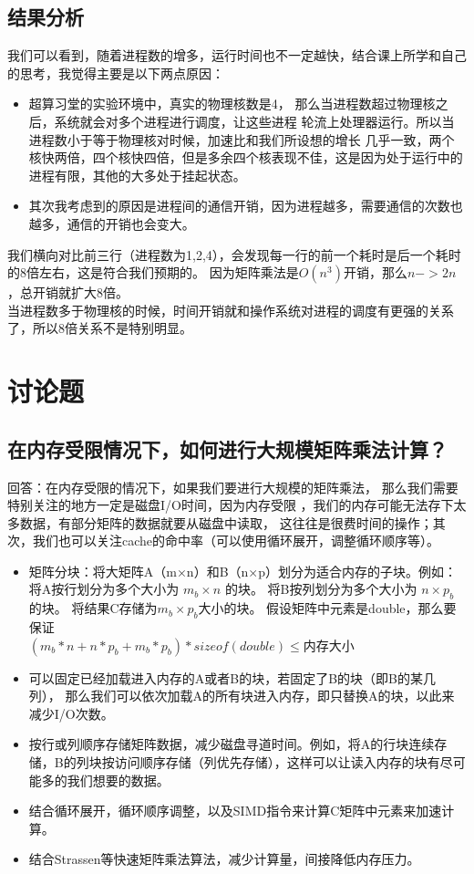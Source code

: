 \documentclass{SYSUReport}
\begin{document}
\subsection{结果分析}
我们可以看到，随着进程数的增多，运行时间也不一定越快，结合课上所学和自己的思考，我觉得主要是以下两点原因：
\begin{itemize}
   \item 超算习堂的实验环境中，真实的物理核数是4，
   那么当进程数超过物理核之后，系统就会对多个进程进行调度，让这些进程
   轮流上处理器运行。所以当进程数小于等于物理核对时候，加速比和我们所设想的增长
   几乎一致，两个核快两倍，四个核快四倍，但是多余四个核表现不佳，这是因为处于运行中的进程有限，其他的大多处于挂起状态。
   \item 其次我考虑到的原因是进程间的通信开销，因为进程越多，需要通信的次数也越多，通信的开销也会变大。 
\end{itemize}
我们横向对比前三行（进程数为1,2,4），会发现每一行的前一个耗时是后一个耗时的8倍左右，这是符合我们预期的。
因为矩阵乘法是$O(n^3)$开销，那么$n->2n$，总开销就扩大8倍。
\\当进程数多于物理核的时候，时间开销就和操作系统对进程的调度有更强的关系了，所以8倍关系不是特别明显。
\section{讨论题}
\subsection{在内存受限情况下，如何进行大规模矩阵乘法计算？}
    回答：在内存受限的情况下，如果我们要进行大规模的矩阵乘法，
    那么我们需要特别关注的地方一定是磁盘I/O时间，因为内存受限
    ，我们的内存可能无法存下太多数据，有部分矩阵的数据就要从磁盘中读取，
    这往往是很费时间的操作；其次，我们也可以关注cache的命中率（可以使用循环展开，调整循环顺序等）。
    \begin{itemize}
        \item 矩阵分块：将大矩阵A（m×n）和B（n×p）划分为适合内存的子块。例如：
            \subitem  将A按行划分为多个大小为 $m_b \times n$ 的块。
            \subitem  将B按列划分为多个大小为 $n \times p_b$ 的块。
            \subitem  将结果C存储为$m_b \times p_b$大小的块。
            \subitem  假设矩阵中元素是double，那么要保证
            \\ \quad \quad \quad \quad \quad$(m_b*n+n*p_b+m_b*p_b)*sizeof(double)\leq$内存大小
        \item 可以固定已经加载进入内存的A或者B的块，若固定了B的块（即B的某几列），
        那么我们可以依次加载A的所有块进入内存，即只替换A的块，以此来减少I/O次数。
        \item 按行或列顺序存储矩阵数据，减少磁盘寻道时间。例如，将A的行块连续存储，B的列块按访问顺序存储（列优先存储），这样可以让读入内存的块有尽可能多的我们想要的数据。
        \item 结合循环展开，循环顺序调整，以及SIMD指令来计算C矩阵中元素来加速计算。
        \item 结合Strassen等快速矩阵乘法算法，减少计算量，间接降低内存压力。
    \end{itemize}
\end{document}
